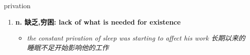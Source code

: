 
\begin{frame}
{\huge privation}
\begin{center}
\begin{enumerate}\Large
  \item \textbf{n. 缺乏,穷困: lack of what is needed for existence}
  \begin{itemize}
    \item \em{\Large{the constant privation of sleep was starting to affect his work 长期以来的睡眠不足开始影响他的工作}}
  \end{itemize}
\end{enumerate}
\end{center}
\end{frame}
